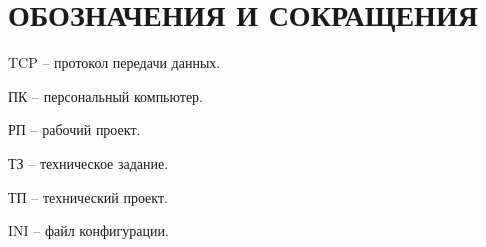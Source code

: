 \newsection
\section*{ОБОЗНАЧЕНИЯ И СОКРАЩЕНИЯ}

TCP -- протокол передачи данных.

ПК -- персональный компьютер.

РП -- рабочий проект.

ТЗ -- техническое задание.

ТП -- технический проект.

INI -- файл конфигурации.
